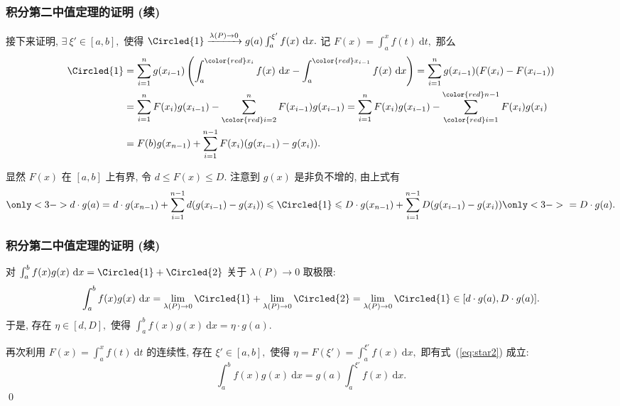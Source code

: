 \begin{frame}
\frametitle{积分第二中值定理的证明 (续)}

接下来证明, $\exists ~ \xi' \in [a, b],$ 使得 $\Circled{1} \xrightarrow{\lambda(P) \to 0} g(a) \int_a^{\xi'} f(x) ~ \mathrm{d} x.$ 记 $F(x) = \int_a^x f(t) ~ \mathrm{d} t,$ 那么
\begin{align*}
\Circled{1} & = \sum_{i=1}^n g(x_{i-1}) \left( \int_a^{{\color{red}x_i}} f(x) ~ \mathrm{d} x - \int_a^{{\color{red}x_{i-1}}} f(x) ~ \mathrm{d} x \right) = \sum_{i=1}^n g(x_{i-1}) (F(x_i) - F(x_{i-1})) \\
& = \sum_{i=1}^n F(x_i) g(x_{i-1}) - \sum_{{\color{red}i=2}}^n F(x_{i-1}) g(x_{i-1}) = \sum_{i=1}^n F(x_i) g(x_{i-1}) - \sum_{{\color{red}i=1}}^{{\color{red}n-1}} F(x_i) g(x_i) \\
& = F(b) g(x_{n-1}) + \sum_{i=1}^{n-1} F(x_i) (g(x_{i-1}) - g(x_i)).
\end{align*}

\pause

显然 $F(x)$ 在 $[a, b]$ 上有界, 令 $d \leqslant F(x) \leqslant D.$ 注意到 $g(x)$ 是非负不增的, 由上式有
\[
{\only<3-> {d \cdot g(a) = ~}} d \cdot g(x_{n-1}) + \sum_{i=1}^{n-1} d (g(x_{i-1}) - g(x_i)) \leqslant \Circled{1} \leqslant D \cdot g(x_{n-1}) + \sum_{i=1}^{n-1} D (g(x_{i-1}) - g(x_i)) {\only<3-> {~ = D \cdot g(a)}}.
\]


\end{frame}


\begin{frame}
\frametitle{积分第二中值定理的证明 (续)}

对 $\int_a^b f(x) g(x) ~ \mathrm{d} x = \Circled{1} + \Circled{2}$ 关于 $\lambda(P) \to 0$ 取极限:
\[
\int_a^b f(x) g(x) ~ \mathrm{d} x = \lim_{\lambda(P) \to 0} \Circled{1} + \lim_{\lambda(P) \to 0} \Circled{2} = \lim_{\lambda(P) \to 0} \Circled{1} \in [d \cdot g(a), D \cdot g(a)].
\]
于是, 存在 $\eta \in [d, D],$ 使得 $\int_a^b f(x) g(x) ~ \mathrm{d} x = \eta \cdot g(a).$

\pause
\vspace{0.5em}

再次利用 $F(x) = \int_a^x f(t) ~ \mathrm{d} t$ 的连续性, 存在 $\xi' \in [a, b],$ 使得 $\eta = F(\xi') = \int_a^{\xi'} f(x) ~ \mathrm{d} x,$ 即有式~(\ref{eq:star2}) 成立:
\[
\int_a^b f(x) g(x) ~ \mathrm{d} x = g(a) \int_a^{\xi'} f(x) ~ \mathrm{d} x.
\]
\qed

\end{frame}



